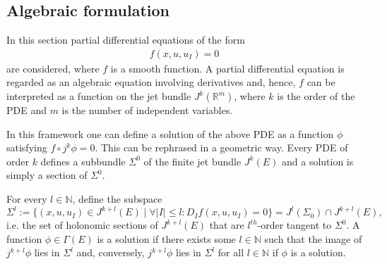 \subsection{Algebraic formulation}

    In this section partial differential equations of the form
    \begin{gather}
        \label{var:pde_jet}
        f(x,u,u_I) = 0
    \end{gather}
    are considered, where $f$ is a smooth function. A partial differential equation is regarded as an algebraic equation involving derivatives and, hence, $f$ can be interpreted as a function on the jet bundle $J^k(\mathbb{R}^m)$, where $k$ is the order of the PDE and $m$ is the number of independent variables.

    In this framework one can define a solution of the above PDE as a function $\phi$ satisfying $f\circ j^k\phi=0$. This can be rephrased in a geometric way. Every PDE of order $k$ defines a subbundle $\Sigma^0$ of the finite jet bundle $J^k(E)$ and a solution is simply a section of $\Sigma^0$.

    \begin{remark}
        For every $l\in\mathbb{N}$, define the subspace \[\Sigma^l:=\{(x,u,u_I)\in J^{k+l}(E)\mid\forall|I|\leq l:D_If(x,u,u_I)= 0\} = J^l(\Sigma_0)\cap J^{k+l}(E),\] i.e. the set of holonomic sections of $J^{k+l}(E)$ that are $l^{th}$-order tangent to $\Sigma^0$. A function $\phi\in\Gamma(E)$ is a solution if there exists some $l\in\mathbb{N}$ such that the image of $j^{k+l}\phi$ lies in $\Sigma^l$ and, conversely, $j^{k+l}\phi$ lies in $\Sigma^l$ for all $l\in\mathbb{N}$ if $\phi$ is a solution.
    \end{remark}

